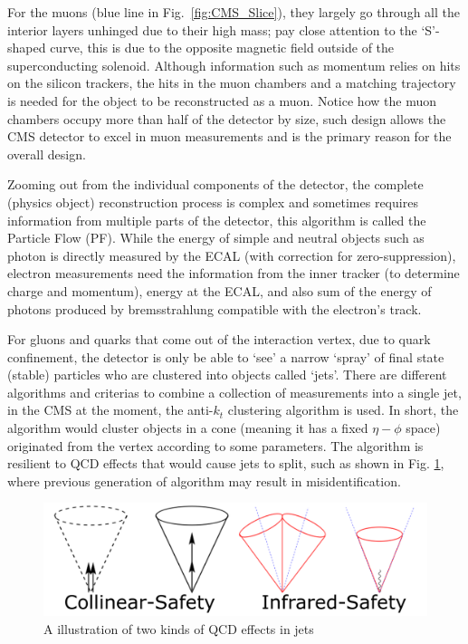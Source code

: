 For the muons (blue line in Fig.~\ref{fig:CMS_Slice}), they largely go through all the interior layers unhinged due to their
high mass; pay close attention to the `S'-shaped curve, this is due to the opposite magnetic
field outside of the superconducting solenoid. Although information such as momentum relies on
hits on the silicon trackers, the hits in the muon chambers and a matching trajectory is needed 
for the object to be reconstructed as a muon. Notice how the
muon chambers occupy more than half of the detector by size, such design allows the CMS 
detector to excel in muon measurements and is the primary reason for the overall design.

Zooming out from the individual components of the detector, the complete (physics object) reconstruction
process is complex and sometimes requires information from multiple parts of the detector, this
algorithm is called the Particle Flow (PF)\cite{particle_flow}. While the energy of simple and neutral 
objects such as photon is directly measured by the ECAL (with correction for zero-suppression), electron measurements
need the information from the inner tracker (to determine charge and momentum), energy at the ECAL, and
also sum of the energy of photons produced by bremsstrahlung compatible with the electron's track.

For gluons and quarks that come out of the interaction vertex, due to quark confinement, the detector 
is only be able to `see' a narrow `spray' of final state (stable) particles who are clustered into objects
called `jets'.
There are different algorithms and criterias to combine a collection of measurements into a single jet,
in the CMS at the moment, the anti-$k_t$ clustering algorithm is used. In short, the algorithm would cluster objects
in a cone (meaning it has a fixed $\eta-\phi$ space) originated from the vertex according to some parameters.
The algorithm is resilient to QCD effects that would cause jets to split, such as shown in Fig.
\ref{fig:jet_split}, where previous generation of algorithm may result in misidentification.

\begin{figure}[htb]
\begin{center}
\includegraphics[width=.85\linewidth]{fig/jet_split.png}
\end{center}
\caption{A illustration of two kinds of QCD effects in jets\protect\footnotemark}
\label{fig:jet_split}
\end{figure}

